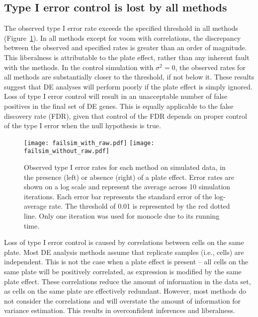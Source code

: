 \documentclass{article}
\begin{document}
\subsection{Type I error control is lost by all methods}
The observed type I error rate exceeds the specified threshold in all methods (Figure~\ref{fig:platefail}).
In all methods except for voom with correlations, the discrepancy between the observed and specified rates is greater than an order of magnitude.
This liberalness is attributable to the plate effect, rather than any inherent fault with the methods.
In the control simulation with $\sigma^2=0$, the observed rates for all methods are substantially closer to the threshold, if not below it.
These results suggest that DE analyses will perform poorly if the plate effect is simply ignored.
Loss of type I error control will result in an unacceptable number of false positives in the final set of DE genes.
This is equally applicable to the false discovery rate (FDR), given that control of the FDR depends on proper control of the type I error when the null hypothesis is true.

\begin{figure}[tbp]
\begin{center}
\texttt{[image: failsim\_with\_raw.pdf]}
\texttt{[image: failsim\_without\_raw.pdf]}
\end{center}
\caption{
    Observed type I error rates for each method on simulated data, in the presence (left) or absence (right) of a plate effect.
    Error rates are shown on a log scale and represent the average across 10 simulation iterations.
    Each error bar represents the standard error of the log-average rate.
    The threshold of 0.01 is represented by the red dotted line.
    Only one iteration was used for monocle due to its running time.
}
\label{fig:platefail}
\end{figure}

Loss of type I error control is caused by correlations between cells on the same plate.
Most DE analysis methods assume that replicate samples (i.e., cells) are independent.
This is not the case when a plate effect is present -- all cells on the same plate will be positively correlated, as expression is modified by the same plate effect.
These correlations reduce the amount of information in the data set, as cells on the same plate are effectively redundant.
However, most methods do not consider the correlations and will overstate the amount of information for variance estimation.
This results in overconfident inferences and liberalness.
\end{document}
